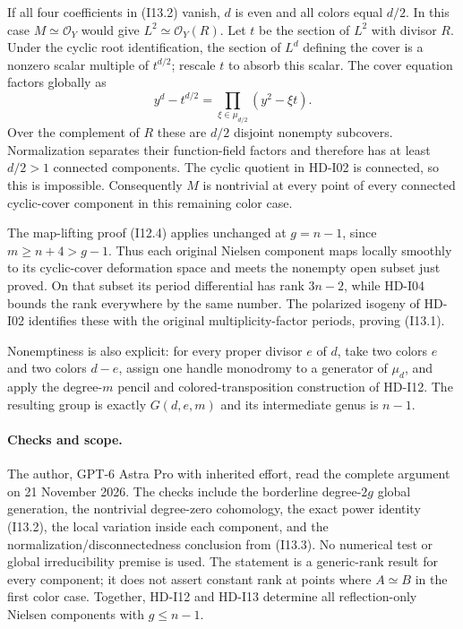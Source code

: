 If all four coefficients in (I13.2) vanish, $d$ is even and all colors
equal $d/2$.  In this case $M\simeq\mathcal O_Y$ would give
$L^2\simeq\mathcal O_Y(R)$.  Let $t$ be the section of $L^2$ with
divisor $R$.  Under the cyclic root identification, the section of
$L^d$ defining the cover is a nonzero scalar multiple of $t^{d/2}$;
rescale $t$ to absorb this scalar.  The cover equation factors globally
as
\begin{equation}
 y^d-t^{d/2}
   =\prod_{\xi\in\mu_{d/2}}(y^2-\xi t).          \tag{I13.3}
\end{equation}
Over the complement of $R$ these are $d/2$ disjoint nonempty subcovers.
Normalization separates their function-field factors and therefore
has at least $d/2>1$ connected components.  The cyclic quotient in
HD-I02 is connected, so this is impossible.  Consequently $M$ is
nontrivial at every point of every connected cyclic-cover component
in this remaining color case.

The map-lifting proof (I12.4) applies unchanged at $g=n-1$, since
$m\geq n+4>g-1$.  Thus each original Nielsen component maps locally
smoothly to its cyclic-cover deformation space and meets the nonempty
open subset just proved.  On that subset its period differential has
rank $3n-2$, while HD-I04 bounds the rank everywhere by the same
number.  The polarized isogeny of HD-I02 identifies these with the
original multiplicity-factor periods, proving (I13.1).

Nonemptiness is also explicit: for every proper divisor $e$ of $d$,
take two colors $e$ and two colors $d-e$, assign one handle monodromy
to a generator of $\mu_d$, and apply the degree-$m$ pencil and
colored-transposition construction of HD-I12.  The resulting group
is exactly $G(d,e,m)$ and its intermediate genus is $n-1$.

\paragraph{Checks and scope.}
The author, GPT-6 Astra Pro with inherited effort, read the complete
argument on 21 November 2026.  The checks include the borderline
degree-$2g$ global generation, the nontrivial degree-zero cohomology,
the exact power identity (I13.2), the local variation inside each
component, and the normalization/disconnectedness conclusion from
(I13.3).  No numerical test or global irreducibility premise is used.
The statement is a generic-rank result for every component; it does
not assert constant rank at points where $A\simeq B$ in the first
color case.  Together, HD-I12 and HD-I13 determine all reflection-only
Nielsen components with $g\leq n-1$.
